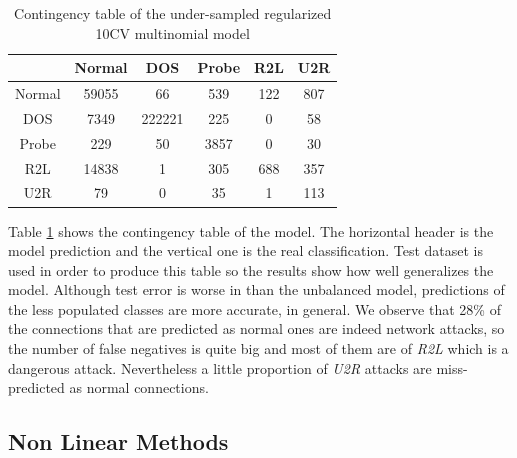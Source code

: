 \documentclass[a4paper]{article} %
\begin{document}
\begin{table}[H]
	\centering
	\begin{tabular}{c | c c c c c}
				& Normal & DOS & Probe & R2L & U2R \\
		\hline
		Normal	& 59055	& 66 	 & 539	 & 122 	& 807 \\
		DOS		& 7349	& 222221 & 225	 & 0  	& 58\\
		Probe	& 229	& 50	 & 3857	 & 0	& 30 \\
		R2L		& 14838	& 1		 & 305   & 688 	& 357\\
		U2R		& 79	& 0		 & 35    & 1 	& 113\\	
	\end{tabular}
	\caption{Contingency table of the under-sampled regularized 10CV multinomial model}
	\label{table:sub10model}
\end{table}

Table \ref{table:sub10model} shows the contingency table of the model. The horizontal header is the model prediction and the vertical one is the real classification. Test dataset is used in order to produce this table so the results show how well generalizes the model. Although test error is worse in than the unbalanced model, predictions of the less populated classes are more accurate, in general. We observe that 28\% of the connections that are predicted as normal ones are indeed network attacks, so the number of false negatives is quite big and most of them are of \textit{R2L} which is a dangerous attack. Nevertheless a little proportion of \textit{U2R} attacks are miss-predicted as normal connections. 
\subsection{Non Linear Methods}


\nocite{*}
\printbibliography

\end{document}
